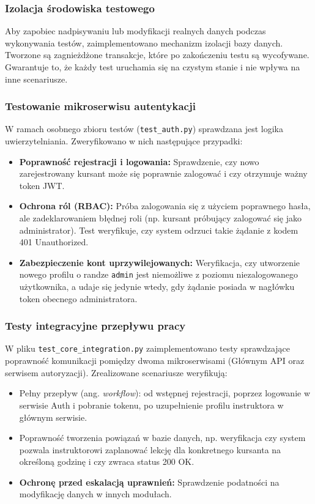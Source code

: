 \documentclass[12pt,twoside]{article}
\begin{document}
\subsubsection{Izolacja środowiska testowego}
Aby zapobiec nadpisywaniu lub modyfikacji realnych danych podczas wykonywania testów, zaimplementowano mechanizm izolacji bazy danych. Tworzone są zagnieżdżone transakcje, które po zakończeniu testu są wycofywane. Gwarantuje to, że każdy test uruchamia się na czystym stanie i nie wpływa na inne scenariusze.

\subsubsection{Testowanie mikroserwisu autentykacji}
W ramach osobnego zbioru testów (\texttt{test\_auth.py}) sprawdzana jest logika uwierzytelniania. Zweryfikowano w nich następujące przypadki:
\begin{itemize}
    \item \textbf{Poprawność rejestracji i logowania:} Sprawdzenie, czy nowo zarejestrowany kursant może się poprawnie zalogować i czy otrzymuje ważny token JWT.
    \item \textbf{Ochrona ról (RBAC):} Próba zalogowania się z użyciem poprawnego hasła, ale zadeklarowaniem błędnej roli (np. kursant próbujący zalogować się jako administrator). Test weryfikuje, czy system odrzuci takie żądanie z kodem 401 Unauthorized.
    \item \textbf{Zabezpieczenie kont uprzywilejowanych:} Weryfikacja, czy utworzenie nowego profilu o randze \texttt{admin} jest niemożliwe z poziomu niezalogowanego użytkownika, a udaje się jedynie wtedy, gdy żądanie posiada w nagłówku token obecnego administratora.
\end{itemize}

\subsubsection{Testy integracyjne przepływu pracy}
W pliku \texttt{test\_core\_integration.py} zaimplementowano testy sprawdzające poprawność komunikacji pomiędzy dwoma mikroserwisami (Głównym API oraz serwisem autoryzacji). Zrealizowane scenariusze weryfikują:
\begin{itemize}
    \item Pełny przepływ (ang. \textit{workflow}): od wstępnej rejestracji, poprzez logowanie w serwisie Auth i pobranie tokenu, po uzupełnienie profilu instruktora w głównym serwisie.
    \item Poprawność tworzenia powiązań w bazie danych, np. weryfikacja czy system pozwala instruktorowi zaplanować lekcję dla konkretnego kursanta na określoną godzinę i czy zwraca status 200 OK.
    \item \textbf{Ochronę przed eskalacją uprawnień:} Sprawdzenie podatności na modyfikację danych w innych modułach.
\end{itemize}
\end{document}

